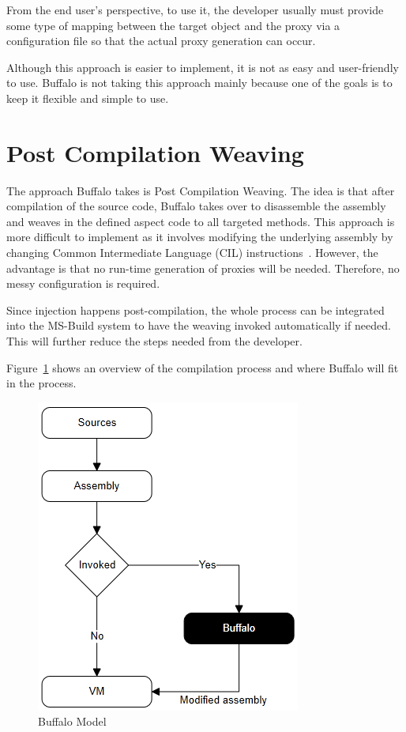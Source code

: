 From the end user's perspective, to use it, the developer usually must provide some type of mapping between the target object and the proxy via a configuration file so that the actual proxy generation can occur. 

Although this approach is easier to implement, it is not as easy and user-friendly to use. Buffalo is not taking this approach mainly because one of the goals is to keep it flexible and simple to use.

\section{Post Compilation Weaving}

The approach Buffalo takes is Post Compilation Weaving. The idea is that after compilation of the source code, Buffalo takes over to disassemble the assembly and weaves in the defined aspect code to all targeted methods. This approach is more difficult to implement as it involves modifying the underlying assembly by changing Common Intermediate Language (CIL) instructions~\cite{rewrite_msil}. However, the advantage is that no run-time generation of proxies will be needed. Therefore, no messy configuration is required.

Since injection happens post-compilation, the whole process can be integrated into the MS-Build system to have the weaving invoked automatically if needed. This will further reduce the steps needed from the developer.

Figure~\ref{buffalo_model} shows an overview of the compilation process and where Buffalo will fit in the process.

\begin{figure}[H]
  \includegraphics[scale=1.0]{BuffaloOverview2.PNG}
  \centering
  \caption{Buffalo Model\label{buffalo_model}}
\end{figure}



